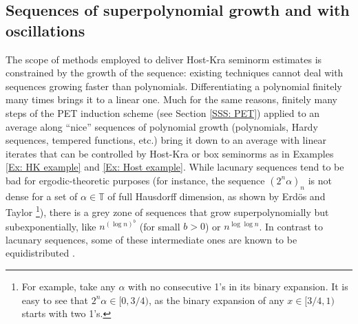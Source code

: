 \documentclass[11pt]{amsart}
\theoremstyle{definition}
\newcommand{\T}{{\mathbb T}}
\newcommand{\CT}{{\mathcal T}}
\newcommand{\1}{{\mathbf{1}}}
\newcommand{\BK}[1]{{\color{Apricot}{{#1}}}}
\begin{document}






    \subsection{Sequences of superpolynomial growth and with oscillations}\label{SSS: superpolynomial}

    The scope of methods employed to deliver Host-Kra seminorm estimates is constrained by the growth of the sequence: existing techniques cannot deal with 
    sequences growing faster than polynomials. Differentiating a polynomial finitely many times brings it to a linear one. Much for the same reasons, finitely many steps of the PET induction scheme (see Section \ref{SSS: PET}) applied to an average along ``nice'' sequences of polynomial growth (polynomials, Hardy sequences, tempered functions, etc.) bring it down to an average with linear iterates that can be controlled by Host-Kra or box seminorms as in Examples \ref{Ex: HK example} and \ref{Ex: Host example}. While lacunary sequences tend to be bad for ergodic-theoretic purposes (for instance, the sequence $(2^n\alpha)_n$ is not dense for a set of $\alpha\in\T$ of full Hausdorff dimension, as shown by Erd\"os and Taylor \cite{ET57}\footnote{For example, take any $\alpha$ with no consecutive 1's in its binary expansion. It is easy to see that $2^n\alpha\in[0,3/4)$, as the binary expansion of any $x\in[3/4,1)$ starts with two 1's.}), there is a grey zone of sequences that grow superpolynomially but subexponentially, like $n^{(\log n)^b}$ (for small $b>0$) or $n^{\log\log n}$. In contrast to lacunary sequences, some of these intermediate ones are known to be equidistributed \cite{Ka71}.
\end{document}

